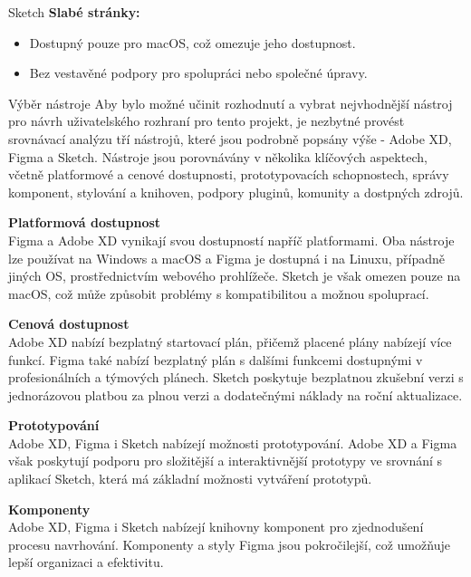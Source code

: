 \begin{subsection}{Sketch}
    \textbf{Slabé stránky:}
    \begin{itemize}
        \item Dostupný pouze pro macOS, což omezuje jeho dostupnost.
        \item Bez vestavěné podpory pro spolupráci nebo společné úpravy\cite{w_industry_the_ultimate_battle_figma_vs_sketch_vs_adobe_xd, sketch}.
    \end{itemize}
\end{subsection}

\begin{subsection}{Výběr nástroje}
    \label{subsec:navrh-ui-nastroje-vyber}
    Aby bylo možné učinit rozhodnutí a vybrat nejvhodnější nástroj pro návrh uživatelského rozhraní pro tento projekt, je nezbytné provést srovnávací analýzu tří nástrojů, které jsou podrobně popsány výše - Adobe XD, Figma a Sketch.
    Nástroje jsou porovnávány v několika klíčových aspektech, včetně platformové a cenové dostupnosti, prototypovacích schopnostech, správy komponent, stylování a knihoven, podpory pluginů, komunity a dostpných zdrojů.

    \textbf{Platformová dostupnost}\\
    Figma a Adobe XD vynikají svou dostupností napříč platformami.
    Oba nástroje lze používat na Windows a macOS a Figma je dostupná i na Linuxu, případně jiných OS, prostřednictvím webového prohlížeče.
    Sketch je však omezen pouze na macOS, což může způsobit problémy s kompatibilitou a možnou spoluprací.

    \textbf{Cenová dostupnost}\\
    Adobe XD nabízí bezplatný startovací plán, přičemž placené plány nabízejí více funkcí.
    Figma také nabízí bezplatný plán s dalšími funkcemi dostupnými v profesionálních a týmových plánech.
    Sketch poskytuje bezplatnou zkušební verzi s jednorázovou platbou za plnou verzi a dodatečnými náklady na roční aktualizace.

    \textbf{Prototypování}\\
    Adobe XD, Figma i Sketch nabízejí možnosti prototypování.
    Adobe XD a Figma však poskytují podporu pro složitější a interaktivnější prototypy ve srovnání s aplikací Sketch, která má základní možnosti vytváření prototypů.

    \textbf{Komponenty}\\
    Adobe XD, Figma i Sketch nabízejí knihovny komponent pro zjednodušení procesu navrhování.
    Komponenty a styly Figma jsou pokročilejší, což umožňuje lepší organizaci a efektivitu.


\end{subsection}
